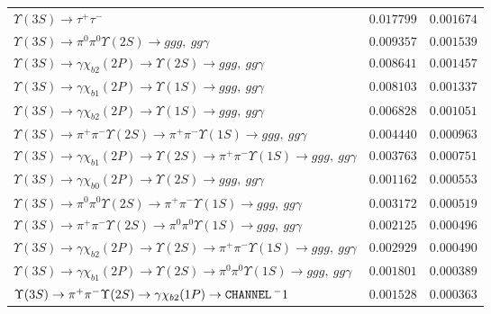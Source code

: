 \documentclass[12pt]{article}
\begin{document}
\begin{tabular}{p{4.7in} l l}
$   \Upsilon(3S) \to \tau^+ \tau^-                                                                                       $ & $   0.017799      $ & $   0.001674     $ \\ 
$   \Upsilon(3S) \to \pi^0 \pi^0 \Upsilon(2S) \to ggg,\ gg\gamma                                                          $ & $   0.009357      $ & $   0.001539     $ \\ 
$   \Upsilon(3S) \to \gamma \chi_{b2}(2P) \to \Upsilon(2S) \to ggg,\ gg\gamma                                             $ & $   0.008641        $ & $   0.001457     $ \\ 
$   \Upsilon(3S) \to \gamma \chi_{b1}(2P) \to \Upsilon(1S) \to ggg,\ gg\gamma                                             $ & $   0.008103      $ & $   0.001337     $ \\ 
$   \Upsilon(3S) \to \gamma \chi_{b2}(2P) \to \Upsilon(1S) \to ggg,\ gg\gamma                                             $ & $   0.006828       $ & $   0.001051     $ \\ 
$   \Upsilon(3S) \to \pi^+ \pi^- \Upsilon(2S) \to \pi^+ \pi^- \Upsilon(1S) \to ggg,\ gg\gamma                             $ & $   0.004440      $ & $   0.000963     $ \\ 
$   \Upsilon(3S) \to \gamma \chi_{b1}(2P) \to \Upsilon(2S) \to \pi^+ \pi^- \Upsilon(1S) \to ggg,\ gg\gamma                $ & $   0.003763     $ & $   0.000751     $ \\ 
$   \Upsilon(3S) \to \gamma \chi_{b0}(2P) \to \Upsilon(2S) \to ggg,\ gg\gamma                                             $ & $   0.001162     $ & $   0.000553     $ \\ 
$   \Upsilon(3S) \to \pi^0 \pi^0 \Upsilon(2S) \to \pi^+ \pi^- \Upsilon(1S) \to ggg,\ gg\gamma                             $ & $   0.003172     $ & $   0.000519     $ \\ 
$   \Upsilon(3S) \to \pi^+ \pi^- \Upsilon(2S) \to \pi^0 \pi^0 \Upsilon(1S) \to ggg,\ gg\gamma                             $ & $   0.002125      $ & $   0.000496     $ \\ 
$   \Upsilon(3S) \to \gamma \chi_{b2}(2P) \to \Upsilon(2S) \to \pi^+ \pi^- \Upsilon(1S) \to ggg,\ gg\gamma                $ & $   0.002929      $ & $   0.000490      $ \\ 
$   \Upsilon(3S) \to \gamma \chi_{b1}(2P) \to \Upsilon(2S) \to \pi^0 \pi^0 \Upsilon(1S) \to ggg,\ gg\gamma                $ & $   0.001801     $ & $   0.000389      $ \\ 
$   \Upsilon(3S) \to \pi^+ \pi^- \Upsilon(2S) \to \gamma \chi_{b2}(1P) \to {\tt \small CHANNEL} \, ^-1                              $ & $   0.001528                 $ & $   0.000363    $ \\ 

\end{tabular}
\end{document}
